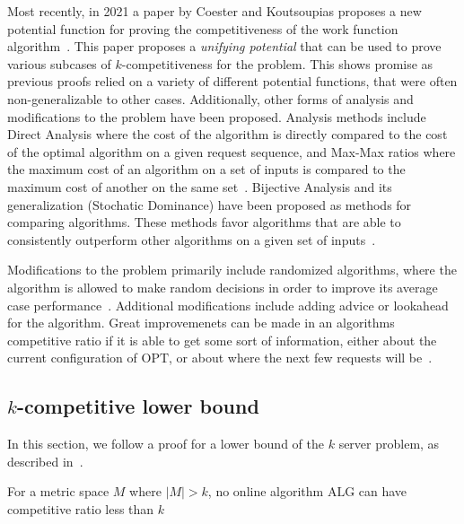 Most recently, in 2021 a paper by Coester and Koutsoupias proposes a new potential function for proving the competitiveness of the work function algorithm~\cite{unifyingPotential2021}. This paper proposes a \textit{unifying potential} that can be used to prove various subcases of $k$-competitiveness for the \KS problem. This shows promise as previous proofs relied on a variety of different potential functions, that were often non-generalizable to other cases.
Additionally, other forms of analysis and modifications to the \KS problem have been proposed. Analysis methods include Direct Analysis where the cost of the algorithm is directly compared to the cost of the optimal algorithm on a given request sequence, and Max-Max ratios where the maximum cost of an algorithm on a set of inputs is compared to the maximum cost of another on the same set~\cite{MAXMAX2005}. Bijective Analysis and its generalization (Stochatic Dominance) have been proposed as methods for comparing algorithms. These methods favor algorithms that are able to consistently outperform other algorithms on a given set of inputs~\cite{bij2016}. 

Modifications to the \KS problem primarily include randomized algorithms, where the algorithm is allowed to make random decisions in order to improve its average case performance~\cite{OnlineComp1998}. Additional modifications include adding advice or lookahead for the algorithm. Great improvemenets can be made in an algorithms competitive ratio if it is able to get some sort of information, either about the current configuration of $\mathrm{OPT}$, or about where the next few requests will be~\cite{advice2015}.

\subsection{$k$-competitive lower bound}
\label{sec:lowerBound}

In this section, we follow a proof for a lower bound of the $k$ server problem, as described in~\cite{server2009}.

\begin{lemma}
    For a metric space $M$ where $|M| > k$, no online algorithm $\mathrm{ALG}$ can have competitive ratio less than $k$
\end{lemma}


